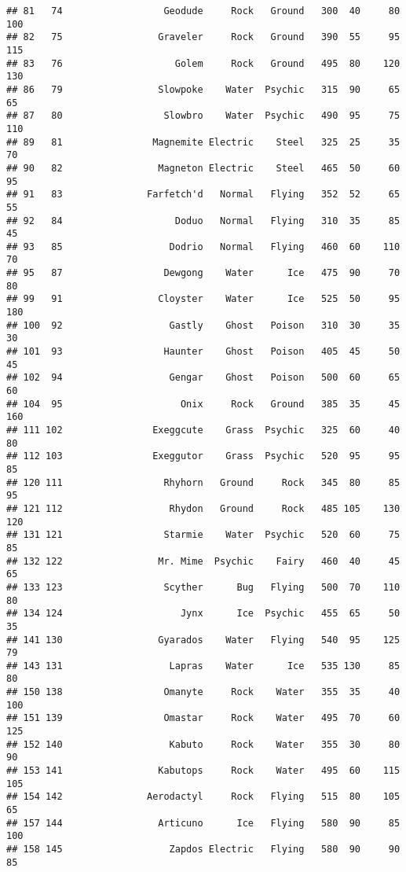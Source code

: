 \documentclass[
]{article}
\begin{document}
\begin{verbatim}
## 81   74                  Geodude     Rock   Ground   300  40     80     100
## 82   75                 Graveler     Rock   Ground   390  55     95     115
## 83   76                    Golem     Rock   Ground   495  80    120     130
## 86   79                 Slowpoke    Water  Psychic   315  90     65      65
## 87   80                  Slowbro    Water  Psychic   490  95     75     110
## 89   81                Magnemite Electric    Steel   325  25     35      70
## 90   82                 Magneton Electric    Steel   465  50     60      95
## 91   83               Farfetch'd   Normal   Flying   352  52     65      55
## 92   84                    Doduo   Normal   Flying   310  35     85      45
## 93   85                   Dodrio   Normal   Flying   460  60    110      70
## 95   87                  Dewgong    Water      Ice   475  90     70      80
## 99   91                 Cloyster    Water      Ice   525  50     95     180
## 100  92                   Gastly    Ghost   Poison   310  30     35      30
## 101  93                  Haunter    Ghost   Poison   405  45     50      45
## 102  94                   Gengar    Ghost   Poison   500  60     65      60
## 104  95                     Onix     Rock   Ground   385  35     45     160
## 111 102                Exeggcute    Grass  Psychic   325  60     40      80
## 112 103                Exeggutor    Grass  Psychic   520  95     95      85
## 120 111                  Rhyhorn   Ground     Rock   345  80     85      95
## 121 112                   Rhydon   Ground     Rock   485 105    130     120
## 131 121                  Starmie    Water  Psychic   520  60     75      85
## 132 122                 Mr. Mime  Psychic    Fairy   460  40     45      65
## 133 123                  Scyther      Bug   Flying   500  70    110      80
## 134 124                     Jynx      Ice  Psychic   455  65     50      35
## 141 130                 Gyarados    Water   Flying   540  95    125      79
## 143 131                   Lapras    Water      Ice   535 130     85      80
## 150 138                  Omanyte     Rock    Water   355  35     40     100
## 151 139                  Omastar     Rock    Water   495  70     60     125
## 152 140                   Kabuto     Rock    Water   355  30     80      90
## 153 141                 Kabutops     Rock    Water   495  60    115     105
## 154 142               Aerodactyl     Rock   Flying   515  80    105      65
## 157 144                 Articuno      Ice   Flying   580  90     85     100
## 158 145                   Zapdos Electric   Flying   580  90     90      85

\end{verbatim}
\end{document}

